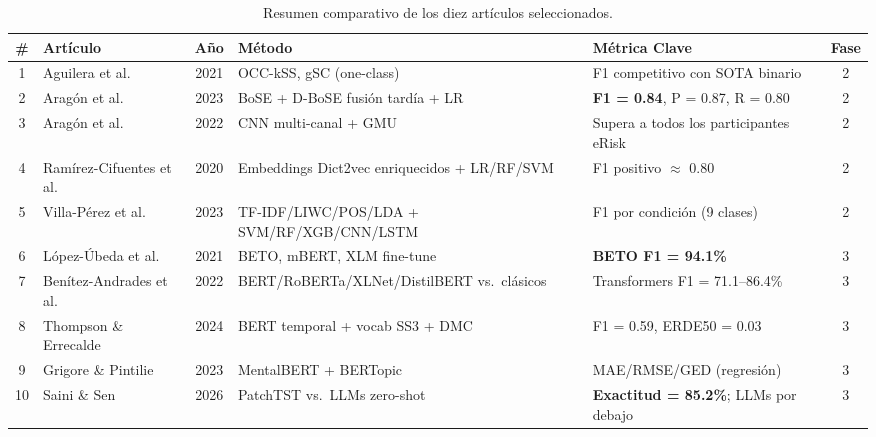 \documentclass[journal]{IEEEtran}
\begin{document}
\begin{table}[!tb]
\centering
\caption{Resumen comparativo de los diez artículos seleccionados.}
\label{tab:comparison}
\footnotesize
\renewcommand{\arraystretch}{1.2}
\setlength{\tabcolsep}{4pt}
\begin{tabularx}{\textwidth}{@{}c l c X l c@{}}
\toprule
\textbf{\#} & \textbf{Artículo} & \textbf{Año} & \textbf{Método} & \textbf{Métrica Clave} & \textbf{Fase} \\
\midrule
1 & Aguilera et al.~\cite{aguilera2021oneclass}           & 2021 & OCC-kSS, gSC (one-class)                    & F1 competitivo con SOTA binario                & 2 \\
2 & Aragón et al.~\cite{aragon2023bose}                   & 2023 & BoSE + D-BoSE fusión tardía + LR            & \textbf{F1 = 0.84}, P = 0.87, R = 0.80         & 2 \\
3 & Aragón et al.~\cite{aragon2022multichannel}           & 2022 & CNN multi-canal + GMU                       & Supera a todos los participantes eRisk         & 2 \\
4 & Ramírez-Cifuentes et al.~\cite{ramirez2020enhanced}   & 2020 & Embeddings Dict2vec enriquecidos + LR/RF/SVM& F1 positivo $\approx$ 0.80                     & 2 \\
5 & Villa-Pérez et al.~\cite{villa2023bilingual}          & 2023 & TF-IDF/LIWC/POS/LDA + SVM/RF/XGB/CNN/LSTM   & F1 por condición (9 clases)                    & 2 \\
6 & López-Úbeda et al.~\cite{lopezubeda2021transfer}      & 2021 & BETO, mBERT, XLM fine-tune                  & \textbf{BETO F1 = 94.1\%}                      & 3 \\
7 & Benítez-Andrades et al.~\cite{benitez2022bert}        & 2022 & BERT/RoBERTa/XLNet/DistilBERT vs.~clásicos  & Transformers F1 = 71.1--86.4\%                 & 3 \\
8 & Thompson \& Errecalde~\cite{thompson2024timeaware}    & 2024 & BERT temporal + vocab SS3 + DMC             & F1 = 0.59, ERDE50 = 0.03                       & 3 \\
9 & Grigore \& Pintilie~\cite{grigore2023mentalbert}      & 2023 & MentalBERT + BERTopic                       & MAE/RMSE/GED (regresión)                       & 3 \\
10 & Saini \& Sen~\cite{saini2026patchtst}                & 2026 & PatchTST vs.~LLMs zero-shot                 & \textbf{Exactitud = 85.2\%}; LLMs por debajo   & 3 \\
\bottomrule
\end{tabularx}
\end{table}
\end{document}
